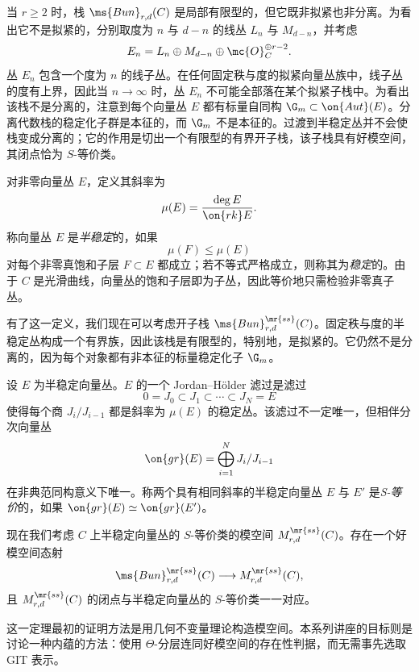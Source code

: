 当 \(r\geq 2\) 时，栈 \(\ms{Bun}_{r,d}(C)\) 是局部有限型的，但它既非拟紧也非分离。为看出它不是拟紧的，分别取度为 \(n\) 与 \(d-n\) 的线丛 \(L_n\) 与 \(M_{d-n}\)，并考虑
\[
    E_n=L_n\oplus M_{d-n}\oplus\mc{O}_C^{\oplus r-2}.
\]
丛 \(E_n\) 包含一个度为 \(n\) 的线子丛。在任何固定秩与度的拟紧向量丛族中，线子丛的度有上界，因此当 \(n\to\infty\) 时，丛 \(E_n\) 不可能全部落在某个拟紧子栈中。为看出该栈不是分离的，注意到每个向量丛 \(E\) 都有标量自同构 \(\G_m\subset\on{Aut}(E)\)。分离代数栈的稳定化子群是本征的，而 \(\G_m\) 不是本征的。过渡到半稳定丛并不会使栈变成分离的；它的作用是切出一个有限型的有界开子栈，该子栈具有好模空间，其闭点恰为 \(S\)-等价类。

\begin{defn}[斜率稳定性]
    对非零向量丛 \(E\)，定义其斜率为
    \[ \mu(E)=\frac{\deg E}{\on{rk}E}. \]
    称向量丛 \(E\) 是\textit{半稳定}的，如果
    \[ \mu(F)\leq\mu(E) \]
    对每个非零真饱和子层 \(F\subset E\) 都成立；若不等式严格成立，则称其为\textit{稳定}的。由于 \(C\) 是光滑曲线，向量丛的饱和子层即为子丛，因此等价地只需检验非零真子丛。
\end{defn}

有了这一定义，我们现在可以考虑开子栈 \(\ms{Bun}_{r,d}^{\mr{ss}}(C)\)。固定秩与度的半稳定丛构成一个有界族，因此该栈是有限型的，特别地，是拟紧的。它仍然不是分离的，因为每个对象都有非本征的标量稳定化子 \(\G_m\)。

\begin{defn}[S-等价]
    设 \(E\) 为半稳定向量丛。\(E\) 的一个 Jordan--H\"older 滤过是滤过
    \[ 0=J_0\subset J_1\subset\cdots\subset J_N=E \]
    使得每个商 \(J_i/J_{i-1}\) 都是斜率为 \(\mu(E)\) 的稳定丛。该滤过不一定唯一，但相伴分次向量丛
    \[
        \on{gr}(E)=\bigoplus_{i=1}^N J_i/J_{i-1}
    \]
    在非典范同构意义下唯一。称两个具有相同斜率的半稳定向量丛 \(E\) 与 \(E'\) 是\textit{S-等价}的，如果 \(\on{gr}(E)\simeq\on{gr}(E')\)。
\end{defn}

现在我们考虑 \(C\) 上半稳定向量丛的 \(S\)-等价类的模空间 \(M_{r,d}^{\mr{ss}}(C)\)。存在一个好模空间态射
\[
    \ms{Bun}_{r,d}^{\mr{ss}}(C)\longrightarrow M_{r,d}^{\mr{ss}}(C),
\]
且 \(M_{r,d}^{\mr{ss}}(C)\) 的闭点与半稳定向量丛的 \(S\)-等价类一一对应。

\begin{rmk}
    这一定理最初的证明方法是用几何不变量理论构造模空间。本系列讲座的目标则是讨论一种内蕴的方法：使用 \(\Theta\)-分层连同好模空间的存在性判据，而无需事先选取 GIT 表示。
\end{rmk}


